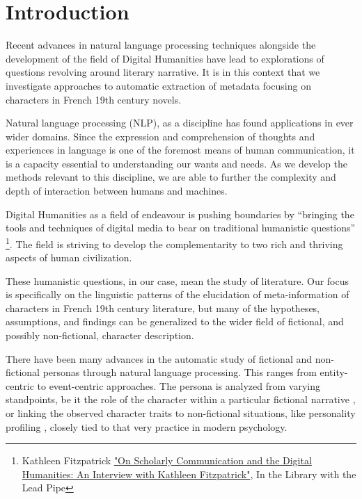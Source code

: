 \section{Introduction}

Recent advances in natural language processing techniques alongside the development of the field of Digital Humanities have lead to explorations of questions revolving around literary narrative. It is in this context that we investigate approaches to automatic extraction of metadata focusing on characters in French 19th century novels.

Natural language processing (NLP), as a discipline has found applications in ever wider domains. Since the expression and comprehension of thoughts and experiences in language is one of the foremost means of human communication, it is a capacity essential to understanding our wants and needs. As we develop the methods relevant to this discipline, we are able to further the complexity and depth of interaction between humans and machines. 

Digital Humanities as a field of endeavour is pushing boundaries by ``bringing the tools and techniques of digital media to bear on traditional humanistic questions'' \footnote{Kathleen Fitzpatrick \href{http://www.inthelibrarywiththeleadpipe.org/2015/on-scholarly-communication-and-the-digital-humanities-an-interview-with-kathleen-fitzpatrick/}{"On Scholarly Communication and the Digital Humanities: An Interview with Kathleen Fitzpatrick"}, In the Library with the Lead Pipe}. The field is striving to develop the complementarity to two rich and thriving aspects of human civilization. 

These humanistic questions, in our case, mean the study of literature. Our focus is specifically on the linguistic patterns of the elucidation of meta-information of characters in French 19th century literature, but many of the hypotheses, assumptions, and findings can be generalized to the wider field of fictional, and possibly non-fictional, character description. 

There have been many advances in the automatic study of fictional and non-fictional personas through natural language processing. This ranges from entity-centric \cite{chambers2013event} to event-centric \cite{cheung2013probabilistic} approaches. The persona is analyzed from varying standpoints, be it the role of the character within a particular fictional narrative \cite{valls2014toward}, or linking the observed character traits to non-fictional situations, like personality profiling \cite{flekova2015personality}, closely tied to that very practice in modern psychology.

